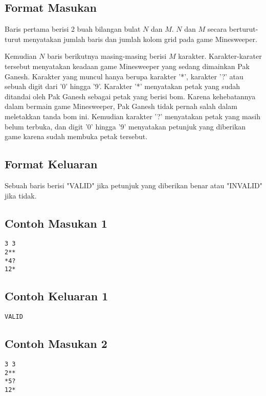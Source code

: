 \documentclass{article}
\begin{document}
\subsection*{Format Masukan}
\par\noindent
Baris pertama berisi 2 buah bilangan bulat $N$ dan $M$. $N$ dan $M$ secara berturut-turut menyatakan jumlah baris dan jumlah kolom grid pada game Minesweeper.
\newline
\par\noindent
Kemudian $N$ baris berikutnya masing-masing berisi $M$ karakter. Karakter-karater tersebut menyatakan keadaan game Minesweeper yang sedang dimainkan Pak Ganesh. Karakter yang muncul hanya berupa karakter '*', karakter '?' atau sebuah digit dari '0' hingga '9'. Karakter '*' menyatakan petak yang sudah ditandai oleh Pak Ganesh sebagai petak yang berisi bom. Karena kehebatannya dalam bermain game Minesweeper, Pak Ganesh tidak pernah salah dalam meletakkan tanda bom ini. Kemudian karakter '?' menyatakan petak yang masih belum terbuka, dan digit '0' hingga '9' menyatakan petunjuk yang diberikan game karena sudah membuka petak tersebut.

\subsection*{Format Keluaran}

\par\noindent Sebuah baris berisi "VALID" jika petunjuk yang diberikan benar atau "INVALID" jika tidak.

\subsection*{Contoh Masukan 1}
\begin{lstlisting}
3 3
2**
*4?
12*
\end{lstlisting}
\subsection*{Contoh Keluaran 1}
\begin{lstlisting}
VALID
\end{lstlisting}


\subsection*{Contoh Masukan 2}
\begin{lstlisting}
3 3
2**
*5?
12*
\end{lstlisting}
\end{document}
